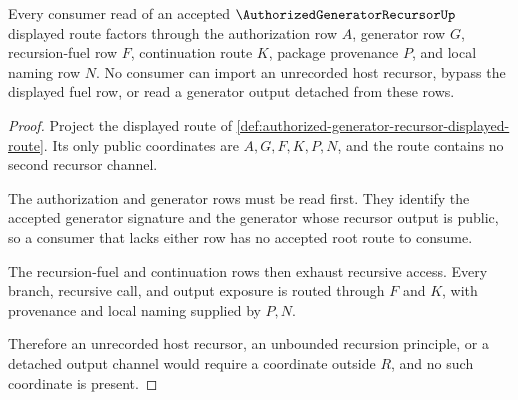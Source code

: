 \begin{theorem}
\label{thm:authorized-generator-recursor-ledger-exhaustion}
Every consumer read of an accepted $\AuthorizedGeneratorRecursorUp$ displayed route factors through the authorization row $A$, generator row $G$, recursion-fuel row $F$, continuation route $K$, package provenance $P$, and local naming row $N$. No consumer can import an unrecorded host recursor, bypass the displayed fuel row, or read a generator output detached from these rows.
\end{theorem}
\begin{proof}
Project the displayed route of \autoref{def:authorized-generator-recursor-displayed-route}. Its only public coordinates are $A,G,F,K,P,N$, and the route contains no second recursor channel.

The authorization and generator rows must be read first. They identify the accepted generator signature and the generator whose recursor output is public, so a consumer that lacks either row has no accepted root route to consume.

The recursion-fuel and continuation rows then exhaust recursive access. Every branch, recursive call, and output exposure is routed through $F$ and $K$, with provenance and local naming supplied by $P,N$.

Therefore an unrecorded host recursor, an unbounded recursion principle, or a detached output channel would require a coordinate outside $R$, and no such coordinate is present.
\end{proof}

